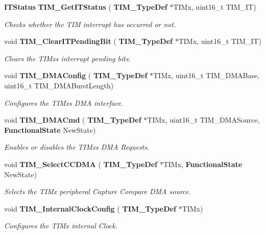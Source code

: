 \begin{DoxyCompactItemize}
\textbf{ I\+T\+Status} \textbf{ T\+I\+M\+\_\+\+Get\+I\+T\+Status} (\textbf{ T\+I\+M\+\_\+\+Type\+Def} $\ast$T\+I\+Mx, uint16\+\_\+t T\+I\+M\+\_\+\+IT)
\begin{DoxyCompactList}\small\item\em Checks whether the T\+IM interrupt has occurred or not. \end{DoxyCompactList}\item 
void \textbf{ T\+I\+M\+\_\+\+Clear\+I\+T\+Pending\+Bit} (\textbf{ T\+I\+M\+\_\+\+Type\+Def} $\ast$T\+I\+Mx, uint16\+\_\+t T\+I\+M\+\_\+\+IT)
\begin{DoxyCompactList}\small\item\em Clears the T\+I\+Mx\textquotesingle{}s interrupt pending bits. \end{DoxyCompactList}\item 
void \textbf{ T\+I\+M\+\_\+\+D\+M\+A\+Config} (\textbf{ T\+I\+M\+\_\+\+Type\+Def} $\ast$T\+I\+Mx, uint16\+\_\+t T\+I\+M\+\_\+\+D\+M\+A\+Base, uint16\+\_\+t T\+I\+M\+\_\+\+D\+M\+A\+Burst\+Length)
\begin{DoxyCompactList}\small\item\em Configures the T\+I\+Mx\textquotesingle{}s D\+MA interface. \end{DoxyCompactList}\item 
void \textbf{ T\+I\+M\+\_\+\+D\+M\+A\+Cmd} (\textbf{ T\+I\+M\+\_\+\+Type\+Def} $\ast$T\+I\+Mx, uint16\+\_\+t T\+I\+M\+\_\+\+D\+M\+A\+Source, \textbf{ Functional\+State} New\+State)
\begin{DoxyCompactList}\small\item\em Enables or disables the T\+I\+Mx\textquotesingle{}s D\+MA Requests. \end{DoxyCompactList}\item 
void \textbf{ T\+I\+M\+\_\+\+Select\+C\+C\+D\+MA} (\textbf{ T\+I\+M\+\_\+\+Type\+Def} $\ast$T\+I\+Mx, \textbf{ Functional\+State} New\+State)
\begin{DoxyCompactList}\small\item\em Selects the T\+I\+Mx peripheral Capture Compare D\+MA source. \end{DoxyCompactList}\item 
void \textbf{ T\+I\+M\+\_\+\+Internal\+Clock\+Config} (\textbf{ T\+I\+M\+\_\+\+Type\+Def} $\ast$T\+I\+Mx)
\begin{DoxyCompactList}\small\item\em Configures the T\+I\+Mx internal Clock. \end{DoxyCompactList}\item 

\end{DoxyCompactItemize}
